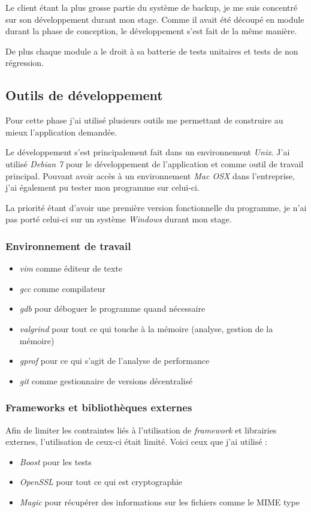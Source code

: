 \documentclass[a4paper,10pt, twoside]{report}
\begin{document}
\begin{spacing}{1.2}
Le client étant la plus grosse partie du système de backup, je me suis
concentré sur son développement durant mon stage. Comme il avait été
découpé en module durant la phase de conception, le développement s'est
fait de la même manière.

De plus chaque module a le droit à sa batterie de tests unitaires et tests de
non régression.

\subsection{Outils de développement}
Pour cette phase j'ai utilisé plusieurs outils me permettant de construire
au mieux l'application demandée. 

Le développement s'est principalement fait dans un environnement
\textit{Unix}. J'ai utilisé \textit{Debian 7} pour le développement de
l'application et comme outil de travail principal. Pouvant avoir accès à un
environnement \textit{Mac OSX} dans l'entreprise, j'ai également pu tester
mon programme sur celui-ci.

La priorité étant d'avoir une première version fonctionnelle du
programme, je n'ai pas porté celui-ci sur un système \textit{Windows}
durant mon stage.

\subsubsection{Environnement de travail}
\begin{itemize}
 \item \textit{vim} comme éditeur de texte
 \item \textit{gcc} comme compilateur
 \item \textit{gdb} pour déboguer le programme quand nécessaire
 \item \textit{valgrind} pour tout ce qui touche à la mémoire (analyse,
 gestion de la mémoire)
 \item \textit{gprof} pour ce qui s'agit de l'analyse de performance
 \item \textit{git} comme gestionnaire de versions décentralisé
\end{itemize}

\subsubsection{Frameworks et bibliothèques externes}
Afin de limiter les contraintes liés à l'utilisation de \textit{framework}
et librairies externes, l'utilisation de ceux-ci était limité. Voici
ceux que j'ai utilisé :
\begin{itemize}
 \item \textit{Boost} pour les tests
 \item \textit{OpenSSL} pour tout ce qui est cryptographie
 \item \textit{Magic} pour récupérer des informations sur les fichiers
 comme le MIME type
\end{itemize}


\end{spacing}
\end{document}
